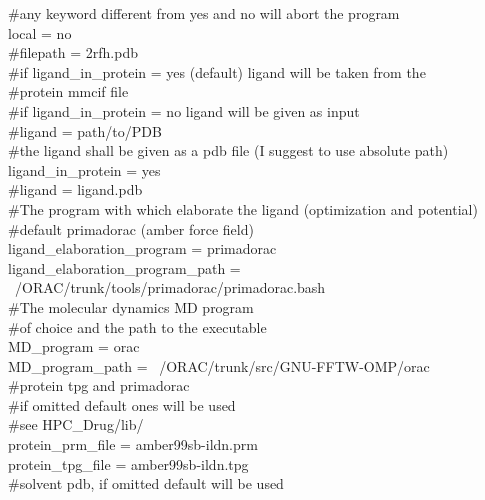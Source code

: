 {					\#any keyword different from yes and no will abort the program\\
					$\ $\\
					local = no\\
					\#filepath = 2rfh.pdb\\
					$\ $\\
					\#if ligand\_in\_protein = yes (default) ligand will be taken from the\\
					\#protein mmcif file\\
					$\ $\\
					\#if ligand\_in\_protein = no ligand will be given as input\\
					\#ligand = path/to/PDB\\
					\#the ligand shall be given as a pdb file (I suggest to use absolute path)\\
					$\ $\\
					ligand\_in\_protein = yes\\
					\#ligand = ligand.pdb\\
					$\ $\\
					\#The program with which elaborate the ligand (optimization and potential)\\
					\#default primadorac (amber force field)\\
					$\ $\\
					ligand\_elaboration\_program = primadorac\\
					ligand\_elaboration\_program\_path = ~/ORAC/trunk/tools/primadorac/primadorac.bash\\
					$\ $\\
					\#The molecular dynamics MD program\\
					\#of choice and the path to the executable\\
					$\ $\\
					MD\_program = orac\\
					MD\_program\_path = ~/ORAC/trunk/src/GNU-FFTW-OMP/orac\\
					$\ $\\
					\#protein tpg and primadorac\\
					\#if omitted default ones will be used\\
					\#see HPC\_Drug/lib/\\
					protein\_prm\_file = amber99sb-ildn.prm\\
					protein\_tpg\_file = amber99sb-ildn.tpg\\
					$\ $\\
					\#solvent pdb, if omitted default will be used\\
}
